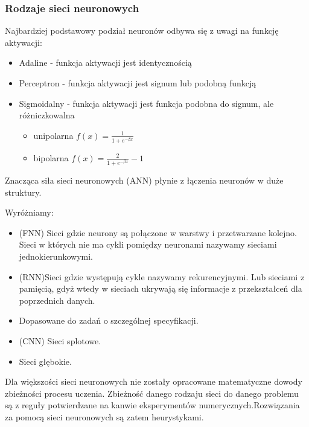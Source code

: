 \documentclass[10pt,a4paper]{book}
\begin{document}
\subsubsection{Rodzaje sieci neuronowych}

Najbardziej podstawowy podział neuronów odbywa się z uwagi na funkcję aktywacji:
\begin{itemize}
\item Adaline - funkcja aktywacji jest identycznością
\item Perceptron - funkcja aktywacji jest signum lub podobną funkcją
\item Sigmoidalny - funkcja aktywacji jest funkcja podobna do signum, ale różniczkowalna
\begin{itemize}
\item unipolarna $ f(x) = \frac{1}{1+e^{-\beta x}}$
\item bipolarna $ f(x) = \frac{2}{1+e^{-\beta x}} -1$
\end{itemize}
\end{itemize}

Znacząca siła sieci neuronowych (ANN) płynie z łączenia neuronów w duże struktury.

Wyróżniamy:
\begin{itemize}
\item (FNN) Sieci gdzie neurony są połączone w warstwy i przetwarzane kolejno. Sieci w których nie ma cykli pomiędzy neuronami nazywamy sieciami jednokierunkowymi.
\item (RNN)Sieci gdzie występują cykle nazywamy rekurencyjnymi. Lub sieciami z pamięcią, gdyż wtedy w sieciach ukrywają się informacje z przekształceń dla poprzednich danych.
\item Dopasowane do zadań o szczególnej specyfikacji.
\item (CNN) Sieci splotowe.
\item Sieci głębokie.
\end{itemize}

\begin{remark*}
Dla większości sieci neuronowych nie zostały opracowane matematyczne dowody zbieżności procesu uczenia. Zbieżność danego rodzaju sieci do danego problemu są z reguły potwierdzane na kanwie eksperymentów numerycznych.Rozwiązania za pomocą sieci neuronowych są zatem heurystykami.
\end{remark*}
\end{document}
